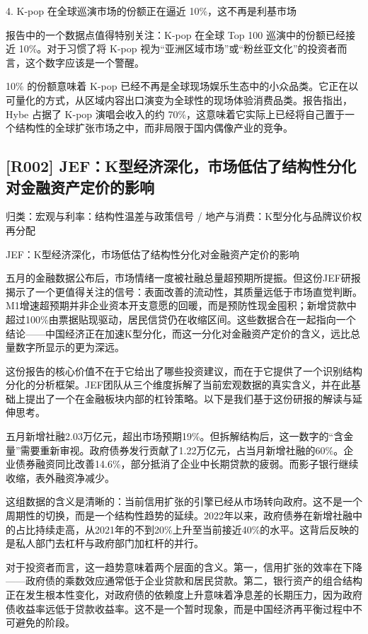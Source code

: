 \documentclass[11pt]{ctexart}
\begin{document}
4. K-pop 在全球巡演市场的份额正在逼近 10\%，这不再是利基市场

报告中的一个数据点值得特别关注：K-pop 在全球 Top 100 巡演中的份额已经接近 10\%。对于习惯了将 K-pop 视为“亚洲区域市场”或“粉丝亚文化”的投资者而言，这个数字应该是一个警醒。

10\% 的份额意味着 K-pop 已经不再是全球现场娱乐生态中的小众品类。它正在以可量化的方式，从区域内容出口演变为全球性的现场体验消费品类。报告指出，Hybe 占据了 K-pop 演唱会收入的约 70\%，这意味着它实际上已经将自己置于一个结构性的全球扩张市场之中，而非局限于国内偶像产业的竞争。

\subsection{[R002] JEF：K型经济深化，市场低估了结构性分化对金融资产定价的影响}
{\small\color{refgray}归类：宏观与利率：结构性温差与政策信号 / 地产与消费：K型分化与品牌议价权再分配}

JEF：K型经济深化，市场低估了结构性分化对金融资产定价的影响

五月的金融数据公布后，市场情绪一度被社融总量超预期所提振。但这份JEF研报揭示了一个更值得关注的信号：表面改善的流动性，其质量远低于市场直觉判断。M1增速超预期并非企业资本开支意愿的回暖，而是预防性现金囤积；新增贷款中超过100\%由票据贴现驱动，居民信贷仍在收缩区间。这些数据合在一起指向一个结论——中国经济正在加速K型分化，而这一分化对金融资产定价的含义，远比总量数字所显示的更为深远。

这份报告的核心价值不在于它给出了哪些投资建议，而在于它提供了一个识别结构分化的分析框架。JEF团队从三个维度拆解了当前宏观数据的真实含义，并在此基础上提出了一个在金融板块内部的杠铃策略。以下是我们基于这份研报的解读与延伸思考。

五月新增社融2.03万亿元，超出市场预期19\%。但拆解结构后，这一数字的“含金量”需要重新审视。政府债券发行贡献了1.22万亿元，占当月新增社融的60\%。企业债券融资同比改善14.6\%，部分抵消了企业中长期贷款的疲弱。而影子银行继续收缩，表外融资净减少。

这组数据的含义是清晰的：当前信用扩张的引擎已经从市场转向政府。这不是一个周期性的切换，而是一个结构性趋势的延续。2022年以来，政府债券在新增社融中的占比持续走高，从2021年的不到20\%上升至当前接近40\%的水平。这背后反映的是私人部门去杠杆与政府部门加杠杆的并行。

对于投资者而言，这一趋势意味着两个层面的含义。第一，信用扩张的效率在下降——政府债的乘数效应通常低于企业贷款和居民贷款。第二，银行资产的组合结构正在发生根本性变化，对政府债的依赖度上升意味着净息差的长期压力，因为政府债收益率远低于贷款收益率。这不是一个暂时现象，而是中国经济再平衡过程中不可避免的阶段。
\end{document}
